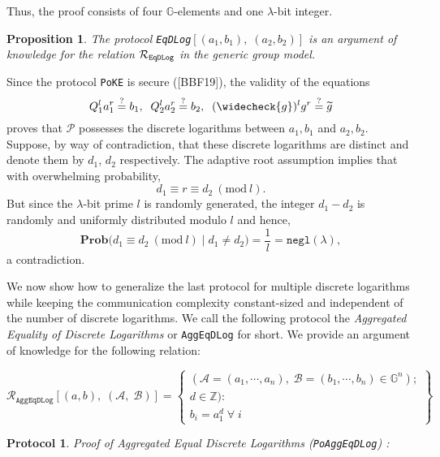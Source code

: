\documentclass[11pt, lettersize, notitlepage, leqno, footskip=0.6cm]{article}
\newcommand{\ttt}{\texttt}
\newcommand{\negl}{\ttt{{negl}}}
\newcommand{\wti}{\widetilde}
\newcommand{\mc}{\mathcal}
\newcommand{\mb}{\mathbb}
\newcommand{\mbf}{\mathbf}
\newcommand{\lam}{\lambda}
\newcommand{\lamb}{\lambda}
\newcommand{\weck}{\widecheck}
\newcommand{\Prob}{\mbf{Prob}}
\newcommand{\vs}{\vspace{-0.15cm}}
\newcommand{\noin}{\noindent}
\newcommand{\op}{overwhelming probability}
\newcommand{\Mod}[1]{\ (\mathrm{mod}\ #1)}
\newtheorem{Prop}[Thm]{Proposition}
\newtheorem{Prot}[Thm]{Protocol}
\numberwithin{equation}{section}
\begin{document}
\noin Thus, the proof consists of four $\mb{G}$-elements and one $\lam$-bit integer. 

\begin{Prop} The protocol \verb|EqDLog|$[(a_1, b_1),\; (a_2, b_2)]$ is an argument of knowledge for the relation $\mc{R}_{{\tt{{EqDLog}}}}$ in the generic group model.\end{Prop}

\begin{prf} Since the protocol \verb|PoKE| is secure ([BBF19]), the validity of the equations \vs $$Q_1^la_1^r \stackrel{?}{=}  b_1, \;\; Q_2^la_2^r \stackrel{?}{=} b_2, \;\; (\weck{g})^l g^r \stackrel{?}{=} \wti{g}$$ proves that $\mc{P}$ possesses the discrete logarithms between $a_1, b_1$ and $a_2, b_2$. Suppose, by way of contradiction, that these discrete logarithms are distinct and denote them by $d_1$, $d_2$ respectively. The adaptive root assumption implies that with \op,\vs $$d_1 \equiv r\equiv d_2 \Mod{l}.$$ But since the $\lamb$-bit prime $l$ is randomly generated, the integer $d_1-d_2$ is randomly and uniformly distributed modulo $l$ and hence, \vs $$ \Prob\big( d_1\equiv d_2\Mod{l}\; \Big|\; d_1\neq d_2    \big) = \frac{1}{l} =\negl(\lamb),$$ a contradiction.\end{prf}

\vspace{0.2cm}

\noindent We now show how to generalize the last protocol for multiple discrete logarithms while keeping the communication complexity constant-sized and independent of the number of discrete logarithms. We call the following protocol the \textit{Aggregated Equality of Discrete Logarithms} or \verb|AggEqDLog| for short. We provide an argument of knowledge for  the following relation:

\[
  \mc{R}_{{\ttt{AggEqDLog}}}[(a, b),\;(\mc{A},\;\mc{B})] = \left\{\begin{array}{l}
    (\mc{A} = (a_1, \cdots, a_n),\;\mc{B} = (b_1,\cdots, b_n)\in\mb{G}^n);\\
    d\in\mb{Z}): \\
    b_i = a_1^{d} \;\forall\;i
  \end{array}\right\}
\]

\vspace{0.1cm}

\begin{Prot} \normalfont \textit{Proof of Aggregated Equal Discrete Logarithms} (\verb|PoAggEqDLog|) :\end{Prot} \vspace{-0.3cm}
\end{document}
